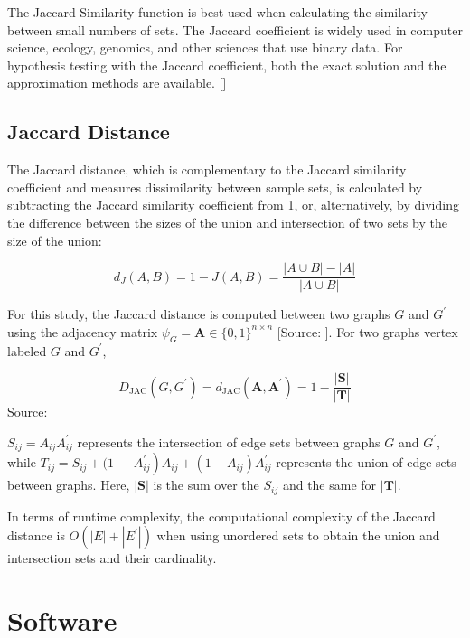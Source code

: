 The Jaccard Similarity function is best used when calculating the similarity between small numbers of sets. The Jaccard coefficient is widely used in computer science, ecology, genomics, and other sciences that use binary data.  For hypothesis testing with the Jaccard coefficient, both the exact solution and the approximation methods are available. [\cite{Chung:2019}]


\subsection{Jaccard Distance}
The Jaccard distance, which is complementary to the Jaccard similarity coefficient and measures dissimilarity between sample sets, is calculated by subtracting the Jaccard similarity coefficient from 1, or, alternatively, by dividing the difference between the sizes of the union and intersection of two sets by the size of the union:

\begin{equation}
d_{J}(A, B)=1-J(A, B)=\frac{|A \cup B|-|A|}{|A \cup B|}
\end{equation}

For this study, the Jaccard distance is computed between two graphs $G$ and $G^{\prime}$ using the adjacency matrix $\psi_{G}=\mathbf{A} \in\{0,1\}^{n \times n}$ [Source: \cite{McCabe:2019}]. For two graphs vertex labeled $G$ and $G^{\prime}$,

\begin{equation}
D_{\mathrm{JAC}}\left(G, G^{\prime}\right)=d_{\mathrm{JAC}}\left(\mathbf{A}, \mathbf{A}^{\prime}\right)=1-\frac{|\mathbf{S}|}{|\mathbf{T}|}
\end{equation}
{Source:\cite{McCabe:2019}}

$S_{i j}=A_{i j} A_{i j}^{\prime}$ represents the intersection of edge sets between graphs $G$ and $G^{\prime}$, while $T_{i j}=S_{i j}+(1-$ $\left.A_{i j}^{\prime}\right) A_{i j}+\left(1-A_{i j}\right) A_{i j}^{\prime}$ represents the union of edge sets between graphs. Here, $|\mathbf{S}|$ is the sum over the $S_{i j}$ and the same for $|\mathbf{T}|$. 

In terms of runtime complexity, the computational complexity of the Jaccard distance is $O\left(|E|+\left|E^{\prime}\right|\right)$ when using unordered sets to obtain the union and intersection sets and their cardinality.

\section{Software}
